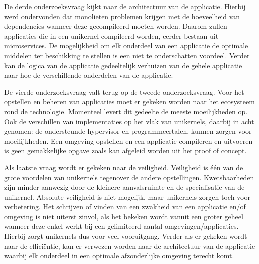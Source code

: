 De derde onderzoeksvraag kijkt naar de architectuur van de applicatie. Hierbij werd ondervonden dat monolieten problemen krijgen met de hoeveelheid van dependencies wanneer deze gecompileerd moeten worden. Daarom zullen applicaties die in een unikernel compileerd worden, eerder bestaan uit microservices. De mogelijkheid om elk onderdeel van een applicatie de optimale middelen ter beschikking te stellen is een niet te onderschatten voordeel. Verder kan de logica van de applicatie gedeeltelijk verhuizen van de gehele applicatie naar hoe de verschillende onderdelen van de applicatie.

De vierde onderzoeksvraag valt terug op de tweede onderzoeksvraag. Voor het opstellen en beheren van applicaties moet er gekeken worden naar het ecosysteem rond de technologie. Momenteel levert dit gedeelte de meeste moeilijkheden op. Ook de verschillen van implementaties op het vlak van unikernels, daarbij in acht genomen: de ondersteunde hypervisor en programmeertalen, kunnen zorgen voor moeilijkheden. Een omgeving opstellen en een applicatie compileren en uitvoeren is geen gemakkelijke opgave zoals kan afgeleid worden uit het proof of concept.

Als laatste vraag wordt er gekeken naar de veiligheid. Veiligheid is één van de grote voordelen van unikernels tegenover de andere opstellingen. Kwetsbaarheden zijn minder aanwezig door de kleinere aanvalsruimte en de specialisatie van de unikernel. Absolute veiligheid is niet mogelijk, maar unikernels zorgen toch voor verbetering. Het schrijven of vinden van een zwakheid van een applicatie en/of omgeving is niet uiterst zinvol, als het bekeken wordt vanuit een groter geheel wanneer deze enkel werkt bij een gelimiteerd aantal omgevingen/applicaties. Hierbij zorgt unikernels dus voor veel vooruitgang. Verder als er gekeken wordt naar de efficiëntie, kan er verwezen worden naar de architectuur van de applicatie waarbij elk onderdeel in een optimale afzonderlijke omgeving terecht komt.
